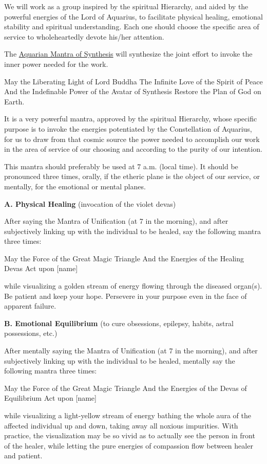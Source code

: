 \documentclass[
]{book}
\begin{document}
We will work as a group inspired by the spiritual Hierarchy, and aided by the powerful energies of the Lord of Aquarius, to facilitate physical healing, emotional stability and spiritual understanding. Each one should choose the specific area of service to wholeheartedly devote his/her attention.

The \href{https://www.agni-yoga.org/AMS.htm}{Aquarian Mantra of Synthesis} will synthesize the joint effort to invoke the inner power needed for the work.

May the Liberating Light of Lord Buddha
The Infinite Love of the Spirit of Peace
And the Indefinable Power of the Avatar of Synthesis
Restore the Plan of God on Earth.

It is a very powerful mantra, approved by the spiritual Hierarchy, whose specific purpose is to invoke the energies potentiated by the Constellation of Aquarius, for us to draw from that cosmic source the power needed to accomplish our work in the area of service of our choosing and according to the purity of our intention.

This mantra should preferably be used at 7 a.m. (local time). It should be pronounced three times, orally, if the etheric plane is the object of our service, or mentally, for the emotional or mental planes.

\textbf{A. Physical Healing} (invocation of the violet devas)

After saying the Mantra of Unification (at 7 in the morning), and after subjectively linking up with the individual to be healed, say the following mantra three times:

May the Force of the Great Magic Triangle
And the Energies of the Healing Devas
Act upon {[}name{]}

while visualizing a golden stream of energy flowing through the diseased organ(s). Be patient and keep your hope. Persevere in your purpose even in the face of apparent failure.

\textbf{B. Emotional Equilibrium}
(to cure obsessions, epilepsy, habits, astral possessions, etc.)

After mentally saying the Mantra of Unification (at 7 in the morning), and after subjectively linking up with the individual to be healed, mentally say the following mantra three times:

May the Force of the Great Magic Triangle
And the Energies of the Devas of Equilibrium
Act upon {[}name{]}

while visualizing a light-yellow stream of energy bathing the whole aura of the affected individual up and down, taking away all noxious impurities. With practice, the visualization may be so vivid as to actually see the person in front of the healer, while letting the pure energies of compassion flow between healer and patient.
\end{document}
